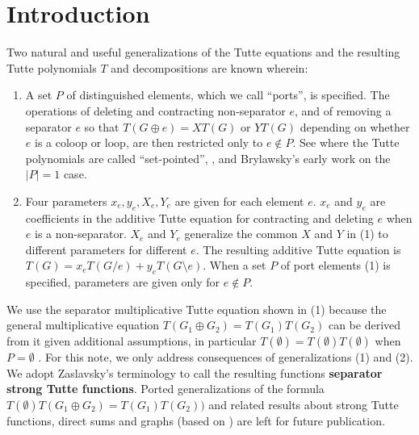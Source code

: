 \documentclass[12pt,leqno]{amsart}
\theoremstyle{remark}
\begin{document}

\section{Introduction}

Two natural and useful generalizations
of the Tutte equations and the resulting
Tutte polynomials $T$ and decompositions are known wherein:
\begin{enumerate}
\item A set $P$ of distinguished elements, which
we call ``ports'', is specified.  The
operations of deleting and contracting 
non-separator $e$,
and of removing a separator $e$
so that $T(G\oplus e)=XT(G)$ or $YT(G)$ depending
on whether $e$ is a coloop or loop, are then
restricted only to $e\not\in P$.  See \cite{SetPointedLV,MR0419272}
where the Tutte polynomials are called ``set-pointed'',
\cite{sdcPorted}, and Brylawsky's early work 
\cite{BrylawskiPointed} on the $|P|=1$ case.
\item
Four parameters $x_e, y_e, X_e, Y_e$ are 
given for each element $e$.  $x_e$ and $y_e$
are coefficients in the additive Tutte 
equation for contracting and deleting
$e$ when $e$ is a non-separator.  $X_e$
and $Y_e$ generalize the common $X$ and $Y$
in (1) to different parameters for
different $e$.
The resulting additive 
Tutte equation is $T(G)=x_eT(G/e)+y_eT(G\setminus e)$.
When a set $P$ of port elements (1) is specified,
parameters are given only for $e\not\in P$.
\end{enumerate}

We use the separator multiplicative Tutte equation shown
in (1) because the general multiplicative equation
$T(G_1\oplus G_2) = T(G_1)T(G_2)$ can be derived from it given
additional assumptions, in particular 
$T(\emptyset)=T(\emptyset)T(\emptyset)$ when $P=\emptyset$
\cite[Corollary 2.3]{Ellis-Monaghan-Traldi}.
For this note, we only address consequences of generalizations
(1) and (2).  We adopt Zaslavsky's terminology\cite{MR93a:05047} to 
call the resulting functions \textbf{separator
strong Tutte functions}.
Ported generalizations of 
the 
formula
$T(\emptyset) T(G_1\oplus G_2) 
= T(G_1) T(G_2))$ \cite{Ellis-Monaghan-Traldi}
and related results about strong Tutte functions\cite{MR93a:05047},
direct sums 
and graphs (based on 
\cite{MR93a:05047,BollobasRiordanTuttePolyColored,Ellis-Monaghan-Traldi}) are 
left for future publication.
\end{document}
